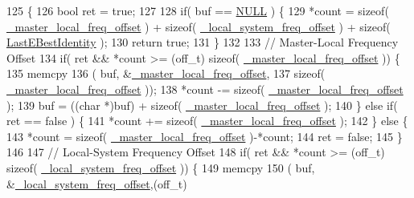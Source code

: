 \begin{DoxyCode}
125                                                             \{
126   \textcolor{keywordtype}{bool} ret = \textcolor{keyword}{true};
127 
128   \textcolor{keywordflow}{if}( buf == \hyperlink{openavb__types__base__pub_8h_a070d2ce7b6bb7e5c05602aa8c308d0c4}{NULL} ) \{
129     *count = \textcolor{keyword}{sizeof}( \hyperlink{class_i_e_e_e1588_clock_acaa18d3a0781792994fc1f34c8f43773}{\_master\_local\_freq\_offset} ) + \textcolor{keyword}{sizeof}( 
      \hyperlink{class_i_e_e_e1588_clock_ad28017a023b91ce56dba976677a7ce1a}{\_local\_system\_freq\_offset} ) + \textcolor{keyword}{sizeof}( \hyperlink{class_i_e_e_e1588_clock_aecec9d272ce3010f56716cdaf7bd1e5c}{LastEBestIdentity} );
130     \textcolor{keywordflow}{return} \textcolor{keyword}{true};
131   \}
132 
133   \textcolor{comment}{// Master-Local Frequency Offset}
134   \textcolor{keywordflow}{if}( ret && *count >= (off\_t) \textcolor{keyword}{sizeof}( \hyperlink{class_i_e_e_e1588_clock_acaa18d3a0781792994fc1f34c8f43773}{\_master\_local\_freq\_offset} )) \{
135       memcpy
136           ( buf, &\hyperlink{class_i_e_e_e1588_clock_acaa18d3a0781792994fc1f34c8f43773}{\_master\_local\_freq\_offset},
137             \textcolor{keyword}{sizeof}( \hyperlink{class_i_e_e_e1588_clock_acaa18d3a0781792994fc1f34c8f43773}{\_master\_local\_freq\_offset} ));
138       *count -= \textcolor{keyword}{sizeof}( \hyperlink{class_i_e_e_e1588_clock_acaa18d3a0781792994fc1f34c8f43773}{\_master\_local\_freq\_offset} );
139       buf = ((\textcolor{keywordtype}{char} *)buf) + \textcolor{keyword}{sizeof}( \hyperlink{class_i_e_e_e1588_clock_acaa18d3a0781792994fc1f34c8f43773}{\_master\_local\_freq\_offset} );
140   \} \textcolor{keywordflow}{else} \textcolor{keywordflow}{if}( ret == \textcolor{keyword}{false} ) \{
141       *count += \textcolor{keyword}{sizeof}( \hyperlink{class_i_e_e_e1588_clock_acaa18d3a0781792994fc1f34c8f43773}{\_master\_local\_freq\_offset} );
142   \} \textcolor{keywordflow}{else} \{
143       *count = \textcolor{keyword}{sizeof}( \hyperlink{class_i_e_e_e1588_clock_acaa18d3a0781792994fc1f34c8f43773}{\_master\_local\_freq\_offset} )-*count;
144       ret = \textcolor{keyword}{false};
145   \}
146 
147   \textcolor{comment}{// Local-System Frequency Offset}
148   \textcolor{keywordflow}{if}( ret && *count >= (off\_t) \textcolor{keyword}{sizeof}( \hyperlink{class_i_e_e_e1588_clock_ad28017a023b91ce56dba976677a7ce1a}{\_local\_system\_freq\_offset} )) \{
149       memcpy
150           ( buf, &\hyperlink{class_i_e_e_e1588_clock_ad28017a023b91ce56dba976677a7ce1a}{\_local\_system\_freq\_offset},(off\_t)

\end{DoxyCode}
